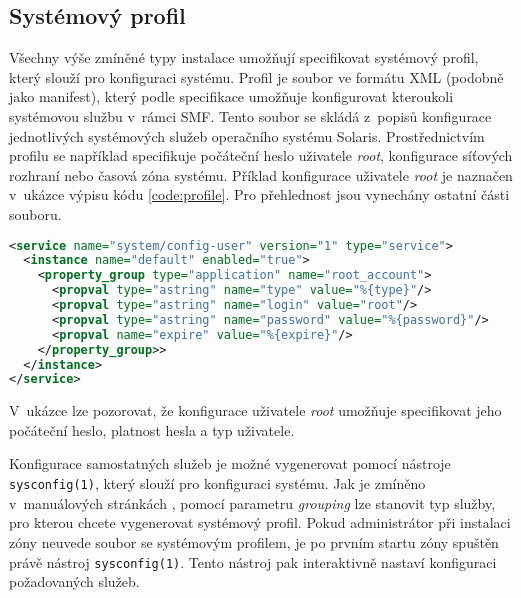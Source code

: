 \subsection{Systémový profil}
\label{chapter:zones:instalation:profile}
Všechny výše zmíněné typy instalace umožňují specifikovat systémový profil, který slouží pro konfiguraci systému. Profil je soubor
ve formátu XML (podobně jako manifest), který podle specifikace \cite{oracle:solaris:zones:profile} umožňuje konfigurovat
kteroukoli systémovou službu v~rámci SMF. Tento soubor se skládá z~popisů konfigurace jednotlivých systémových služeb
operačního systému Solaris. Prostřednictvím profilu se například specifikuje počáteční heslo uživatele \textit{root}, konfigurace 
síťových rozhraní nebo časová zóna systému. Příklad konfigurace uživatele \textit{root} je naznačen v~ukázce výpisu kódu \ref{code:profile}.
Pro přehlednost jsou vynechány ostatní části souboru.
\begin{lstlisting}[language={XML}, caption={Konfigurace uživatele root}, label={code:profile}]
<service name="system/config-user" version="1" type="service">
  <instance name="default" enabled="true">
    <property_group type="application" name="root_account">
      <propval type="astring" name="type" value="%{type}"/>
      <propval type="astring" name="login" value="root"/>
      <propval type="astring" name="password" value="%{password}"/>
      <propval name="expire" value="%{expire}"/>
    </property_group>>
  </instance>
</service>
\end{lstlisting}
V~ukázce lze pozorovat, že konfigurace uživatele \textit{root} umožňuje specifikovat jeho počáteční heslo, platnost hesla a typ uživatele.

Konfigurace samostatných služeb je možné vygenerovat pomocí nástroje \verb|sysconfig(1)|, který slouží pro konfiguraci systému.
Jak je zmíněno v~manuálových stránkách \cite{oracle:manpages:sysconfig}, pomocí parametru \textit{grouping} lze stanovit typ
služby, pro kterou chcete vygenerovat systémový profil. Pokud administrátor při instalaci zóny neuvede soubor se systémovým
profilem, je po prvním startu zóny spuštěn právě nástroj \verb|sysconfig(1)|. Tento nástroj pak interaktivně nastaví konfiguraci
požadovaných služeb.

